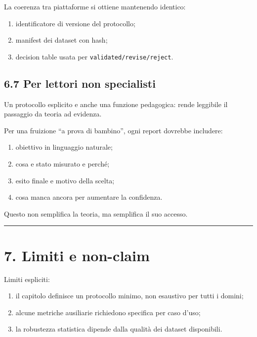 La coerenza tra piattaforme si ottiene mantenendo identico:

\begin{enumerate}
\def\labelenumi{\arabic{enumi}.}
\tightlist
\item
  identificatore di versione del protocollo;
\item
  manifest dei dataset con hash;
\item
  decision table usata per \texttt{validated/revise/reject}.
\end{enumerate}

\subsection{6.7 Per lettori non specialisti}

Un protocollo esplicito e anche una funzione pedagogica: rende leggibile il passaggio da teoria ad evidenza.

Per una fruizione ``a prova di bambino'', ogni report dovrebbe includere:

\begin{enumerate}
\def\labelenumi{\arabic{enumi}.}
\tightlist
\item
  obiettivo in linguaggio naturale;
\item
  cosa e stato misurato e perché;
\item
  esito finale e motivo della scelta;
\item
  cosa manca ancora per aumentare la confidenza.
\end{enumerate}

Questo non semplifica la teoria, ma semplifica il suo accesso.

\begin{center}\rule{0.5\linewidth}{0.5pt}\end{center}

\section{7. Limiti e non-claim}

Limiti espliciti:

\begin{enumerate}
\def\labelenumi{\arabic{enumi}.}
\tightlist
\item
  il capitolo definisce un protocollo minimo, non esaustivo per tutti i domini;
\item
  alcune metriche ausiliarie richiedono specifica per caso d'uso;
\item
  la robustezza statistica dipende dalla qualità dei dataset disponibili.
\end{enumerate}

